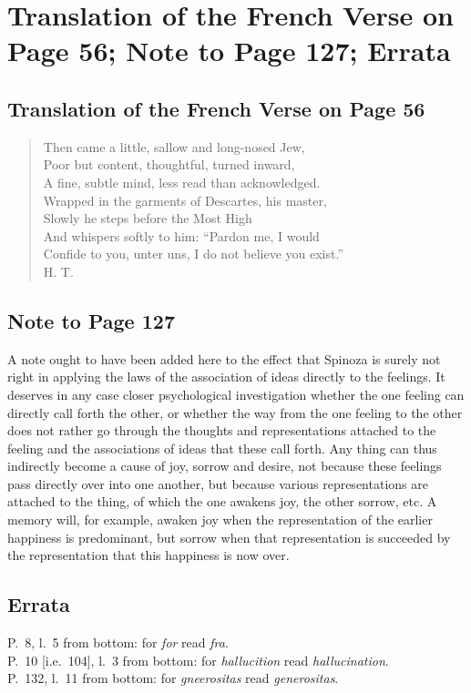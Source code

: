 \documentclass[12pt]{book}
\newcommand{\opage}[1]{\marginnote{\footnotesize\textit{[#1]}}}
\begin{document}
\chapter*{Translation of the French Verse on Page 56; Note to Page 127; Errata}
\opage{166}\section*{Translation of the French Verse on Page 56}
\begin{quote}
Then came a little, sallow and long-nosed Jew,\\
Poor but content, thoughtful, turned inward,\\
A fine, subtle mind, less read than acknowledged.\\
Wrapped in the garments of Descartes, his master,\\
Slowly he steps before the Most High\\
And whispers softly to him: ``Pardon me, I would\\
Confide to you, unter uns, I do not believe you exist.''\\
\hspace*{\fill}H. T.
\end{quote}

\section*{Note to Page 127}
A note ought to have been added here to the effect that Spinoza is surely not right in
applying the laws of the association of ideas directly to the feelings. It deserves in any
case closer psychological investigation whether the one feeling can directly call forth
the other, or whether the way from the one feeling to the other does not rather go through
the thoughts and representations attached to the feeling and the associations of ideas
that these call forth. Any thing can thus indirectly become a cause of joy, sorrow and
desire, not because these feelings pass directly over into one another, but because
various representations are attached to the thing, of which the one awakens joy, the
other sorrow, etc. A memory will, for example, awaken joy when the representation of the
earlier happiness is predominant, but sorrow when that representation is succeeded by the
representation that this happiness is now over.

\section*{Errata}
\begin{center}
P.~8, l.~5 from bottom: for \textit{for} read \textit{fra}.\\
P.~10 [i.e.\ 104], l.~3 from bottom: for \textit{hallucition} read \textit{hallucination}.\\
P.~132, l.~11 from bottom: for \textit{gneerositas} read \textit{generositas}.
\end{center}
\end{document}

